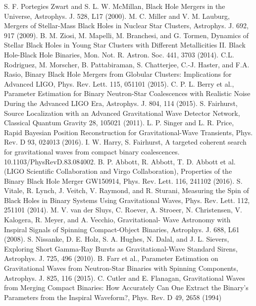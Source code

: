\documentclass[binding=0.6cm, LaM]{sapthesis}
\begin{document}
\begin{thebibliography}{500}
         S. F. Portegies Zwart and S. L. W. McMillan, Black Hole Mergers in the Universe, Astrophys. J. 528, L17 (2000).
         M. C. Miller and V. M. Lauburg, Mergers of Stellar-Mass Black Holes in Nuclear Star Clusters, Astrophys. J. 692, 917 (2009).
         B. M. Ziosi, M. Mapelli, M. Branchesi, and G. Tormen, Dynamics of Stellar Black Holes in Young Star Clusters with Different Metallicities II. Black Hole-Black Hole Binaries, Mon. Not. R. Astron. Soc. 441, 3703 (2014).
          C.L. Rodriguez, M. Morscher, B. Pattabiraman, S. Chatterjee, C.-J. Haster, and F.A. Rasio, Binary Black Hole Mergers from Globular Clusters: Implications for Advanced LIGO, Phys. Rev. Lett. 115, 051101 (2015).
          C. P. L. Berry et al., Parameter Estimation for Binary Neutron-Star Coalescences with Realistic Noise During the Advanced LIGO Era, Astrophys. J. 804, 114 (2015).
 	 S. Fairhurst, Source Localization with an Advanced Gravitational Wave Detector Network, Classical Quantum Gravity 28, 105021 (2011).
          L. P. Singer and L. R. Price, Rapid Bayesian Position Reconstruction for Gravitational-Wave Transients, Phys. Rev. D 93, 024013 (2016).
   	 I. W. Harry,  S. Fairhurst, A targeted coherent search for gravitational waves from compact binary coalescences. 10.1103/PhysRevD.83.084002. 
    	 B. P. Abbott, R. Abbott, T. D. Abbott et al. (LIGO Scientific Collaboration and Virgo Collaboration), Properties of the Binary Black Hole Merger GW150914, Phys. Rev. Lett. 116, 241102 (2016).
 	 S. Vitale, R. Lynch, J. Veitch, V. Raymond, and R. Sturani, Measuring the Spin of Black Holes in Binary Systems Using Gravitational Waves, Phys. Rev. Lett. 112, 251101 (2014). 
 	 M. V. van der Sluys, C. Roever, A. Stroeer, N. Christensen, V. Kalogera, R. Meyer, and A. Vecchio, Gravitational- Wave Astronomy with Inspiral Signals of Spinning Compact-Object Binaries,        Astrophys. J. 688, L61 (2008).
         S. Nissanke, D. E. Holz, S. A. Hughes, N. Dalal, and J. L. Sievers, Exploring Short Gamma-Ray Bursts as Gravitational-Wave Standard Sirens, Astrophys. J. 725, 496 (2010).
          B. Farr et al., Parameter Estimation on Gravitational Waves from Neutron-Star Binaries with Spinning Components, Astrophys. J. 825, 116 (2015).
    	 C. Cutler and E. Flanagan, Gravitational Waves from Merging Compact Binaries: How Accurately Can One Extract the Binary’s Parameters from the Inspiral Waveform?, Phys. Rev. D 49, 2658 (1994) 

\end{thebibliography}
\end{document}
